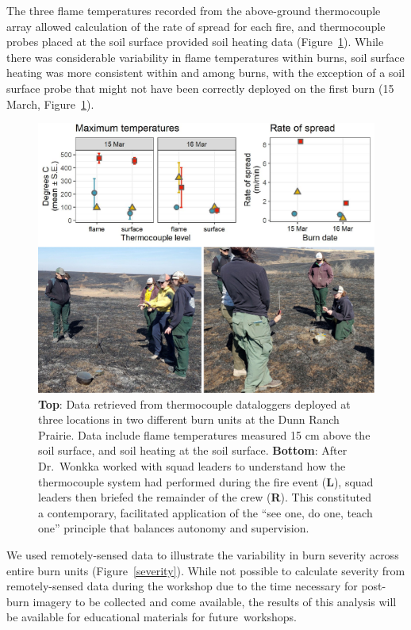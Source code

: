 \documentclass[fire,casereport,accept,moreauthors,pdftex]{Definitions/mdpi}  %
\begin{document}
The three flame temperatures recorded from the above-ground thermocouple array allowed calculation of the rate of spread for each fire, and thermocouple probes placed at the soil surface provided soil heating data (Figure~\ref{thermocouples}).
While there was considerable variability in flame temperatures within burns, soil surface heating was more consistent within and among burns, with the exception of a soil surface probe that might not have been correctly deployed on the first burn (15 March, Figure~\ref{thermocouples}).

\begin{figure}[H]
\includegraphics[width=1\columnwidth]{thermocouples.pdf}
\caption{\textbf{Top}: Data retrieved from thermocouple dataloggers deployed at three locations in two different burn units at the Dunn Ranch Prairie. Data include flame temperatures measured 15 cm above the soil surface, and soil heating at the soil surface. \textbf{Bottom}: After Dr.~Wonkka worked with squad leaders to understand how the thermocouple system had performed during the fire event (\textbf{L}), squad leaders then briefed the remainder of the crew (\textbf{R}). This constituted a contemporary, facilitated application of the ``see one, do one, teach one'' principle that balances autonomy and supervision. \label{thermocouples}}
\end{figure}

We used remotely-sensed data to illustrate the variability in burn severity across entire burn units (Figure~\ref{severity}).
While not possible to calculate severity from remotely-sensed data during the workshop due to the time necessary for post-burn imagery to be collected and come available, the results of this analysis will be available for educational materials for future~workshops.
\end{document}
